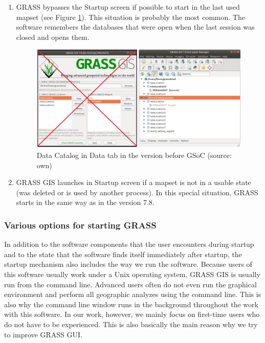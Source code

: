 \documentclass[a4paper,10pt,twoside]{article}
\begin{document}
\begin{enumerate}
\item GRASS bypasses the Startup screen if possible to start in the last used mapset (see Figure \ref{fig:last_mapset_startup}). This situation is probably the most common. The software remembers the databases that were open when the last session was closed and opens them.

\vspace{0.3cm}
\begin{figure}[hbt!] 
\begin{center}
\includegraphics[width=15cm]{../pictures/last_mapset_startup.png} 
\caption[Data Catalog in Data tab (version before GSoC)]{Data Catalog in Data tab in the version before GSoC (source: own)}
\label{fig:last_mapset_startup}
\end{center}
\end{figure}

\newpage
\item GRASS GIS launches in Startup screen if a mapset is not in a usable state (was deleted or is used by another process). In this special situation, GRASS starts in the same way as in the version 7.8.

\end{enumerate}

\subsubsection{Various options for starting GRASS}

\large \noindent In addition to the software components that the user encounters during startup and to the state that the software finds itself immediately after startup, the startup mechanism also includes the way we run the software. Because users of this software usually work under a Unix operating system, GRASS GIS is usually run from the command line. Advanced users often do not even run the graphical environment and perform all geographic analyzes using the command line. This is also why the command line window runs in the background throughout the work with this software. In our work, however, we mainly focus on first-time users who do not have to be experienced. This is also basically the main reason why we try to improve GRASS GUI.
\end{document}
